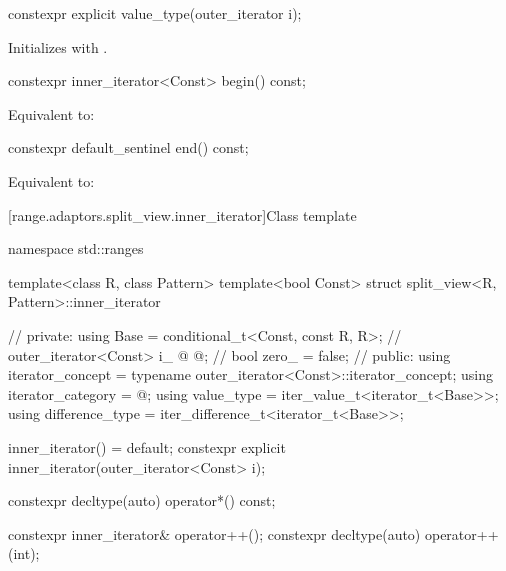 \begin{addedblock}
%
\begin{itemdecl}
constexpr explicit value_type(outer_iterator i);
\end{itemdecl}

\begin{itemdescr}
\pnum
\effects Initializes  with .
\end{itemdescr}

%
\begin{itemdecl}
constexpr inner_iterator<Const> begin() const;
\end{itemdecl}

\begin{itemdescr}
\pnum
\effects Equivalent to: 
\end{itemdescr}

%
\begin{itemdecl}
constexpr default_sentinel end() const;
\end{itemdecl}

\begin{itemdescr}
\pnum
\effects Equivalent to: 
\end{itemdescr}

[range.adaptors.split_view.inner_iterator]{Class template }

\begin{codeblock}
namespace std::ranges {
  template<class R, class Pattern>
  template<bool Const>
  struct split_view<R, Pattern>::inner_iterator { // \expos
  private:
    using Base =
      conditional_t<Const, const R, R>; // \expos
    outer_iterator<Const> i_ @\oldtxt{\{\}} @;        // \expos
    bool zero_ = false;                 // \expos
  public:
    using iterator_concept  = typename outer_iterator<Const>::iterator_concept;
    using iterator_category = @\seebelownc@;
    using value_type        = iter_value_t<iterator_t<Base>>;
    using difference_type   = iter_difference_t<iterator_t<Base>>;

    inner_iterator() = default;
    constexpr explicit inner_iterator(outer_iterator<Const> i);

    constexpr decltype(auto) operator*() const;

    constexpr inner_iterator& operator++();
    constexpr decltype(auto) operator++(int);

}}
\end{codeblock}
\end{addedblock}
